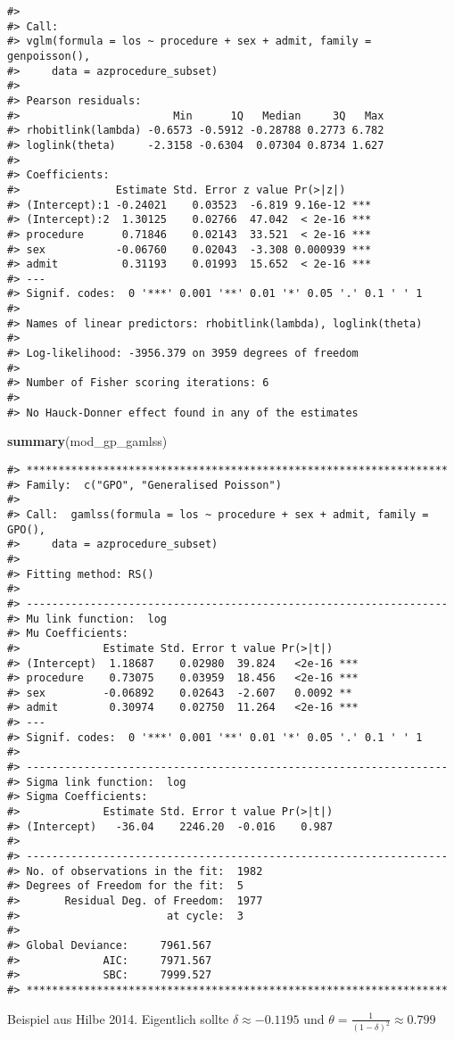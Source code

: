 \documentclass[ngerman,a4paper,]{scrartcl}
\newenvironment{Shaded}{\begin{snugshade}}{\end{snugshade}}
\newcommand{\KeywordTok}[1]{\textcolor[rgb]{0.13,0.29,0.53}{\textbf{#1}}}
\newcommand{\NormalTok}[1]{#1}
\theoremstyle{definition}
\theoremstyle{definition}
\theoremstyle{definition}
\theoremstyle{remark}
\begin{document}
\begin{verbatim}
#> 
#> Call:
#> vglm(formula = los ~ procedure + sex + admit, family = genpoisson(), 
#>     data = azprocedure_subset)
#> 
#> Pearson residuals:
#>                        Min      1Q   Median     3Q   Max
#> rhobitlink(lambda) -0.6573 -0.5912 -0.28788 0.2773 6.782
#> loglink(theta)     -2.3158 -0.6304  0.07304 0.8734 1.627
#> 
#> Coefficients: 
#>               Estimate Std. Error z value Pr(>|z|)    
#> (Intercept):1 -0.24021    0.03523  -6.819 9.16e-12 ***
#> (Intercept):2  1.30125    0.02766  47.042  < 2e-16 ***
#> procedure      0.71846    0.02143  33.521  < 2e-16 ***
#> sex           -0.06760    0.02043  -3.308 0.000939 ***
#> admit          0.31193    0.01993  15.652  < 2e-16 ***
#> ---
#> Signif. codes:  0 '***' 0.001 '**' 0.01 '*' 0.05 '.' 0.1 ' ' 1
#> 
#> Names of linear predictors: rhobitlink(lambda), loglink(theta)
#> 
#> Log-likelihood: -3956.379 on 3959 degrees of freedom
#> 
#> Number of Fisher scoring iterations: 6 
#> 
#> No Hauck-Donner effect found in any of the estimates
\end{verbatim}

\begin{Shaded}
\begin{Highlighting}[]
\KeywordTok{summary}\NormalTok{(mod_gp_gamlss)}
\end{Highlighting}
\end{Shaded}

\begin{verbatim}
#> ******************************************************************
#> Family:  c("GPO", "Generalised Poisson") 
#> 
#> Call:  gamlss(formula = los ~ procedure + sex + admit, family = GPO(),  
#>     data = azprocedure_subset) 
#> 
#> Fitting method: RS() 
#> 
#> ------------------------------------------------------------------
#> Mu link function:  log
#> Mu Coefficients:
#>             Estimate Std. Error t value Pr(>|t|)    
#> (Intercept)  1.18687    0.02980  39.824   <2e-16 ***
#> procedure    0.73075    0.03959  18.456   <2e-16 ***
#> sex         -0.06892    0.02643  -2.607   0.0092 ** 
#> admit        0.30974    0.02750  11.264   <2e-16 ***
#> ---
#> Signif. codes:  0 '***' 0.001 '**' 0.01 '*' 0.05 '.' 0.1 ' ' 1
#> 
#> ------------------------------------------------------------------
#> Sigma link function:  log
#> Sigma Coefficients:
#>             Estimate Std. Error t value Pr(>|t|)
#> (Intercept)   -36.04    2246.20  -0.016    0.987
#> 
#> ------------------------------------------------------------------
#> No. of observations in the fit:  1982 
#> Degrees of Freedom for the fit:  5
#>       Residual Deg. of Freedom:  1977 
#>                       at cycle:  3 
#>  
#> Global Deviance:     7961.567 
#>             AIC:     7971.567 
#>             SBC:     7999.527 
#> ******************************************************************
\end{verbatim}

Beispiel aus Hilbe 2014. Eigentlich sollte \(\delta \approx -0.1195\) und \(\theta = \frac{1}{(1 - \delta)^2} \approx 0.799\)


\end{document}
